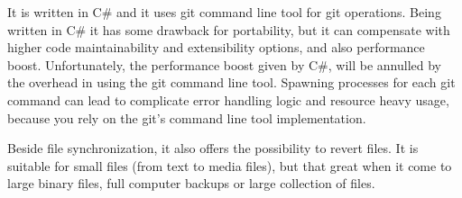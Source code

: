         It is written in C\# and it uses git command line tool for git operations. Being written in C\# it has some drawback for portability, but it can compensate with higher code maintainability and extensibility options, and also performance boost. Unfortunately, the performance boost given by C\#, will be annulled by the overhead in using the git command line tool. Spawning processes for each git command can lead to complicate error handling logic and resource heavy usage, because you rely on the git's command line tool implementation.
        
        Beside file synchronization, it also offers the possibility to revert files. It is suitable for small files (from text to media files), but that great when it come to large binary files, full computer backups or large collection of files. 